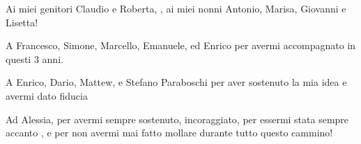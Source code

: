 \begin{flushright}
Ai miei genitori Claudio e Roberta, , ai miei nonni Antonio, Marisa, Giovanni e Lisetta!

\bigskip

A Francesco, Simone, Marcello, Emanuele, ed Enrico per avermi accompagnato in questi 3 anni.

\bigskip

A Enrico, Dario, Mattew, e Stefano Paraboschi per aver sostenuto la mia idea e avermi dato fiducia

\bigskip

Ad Alessia, per avermi sempre sostenuto, incoraggiato, per essermi stata sempre accanto , e per non avermi mai fatto mollare durante tutto questo cammino! 


\end{flushright}